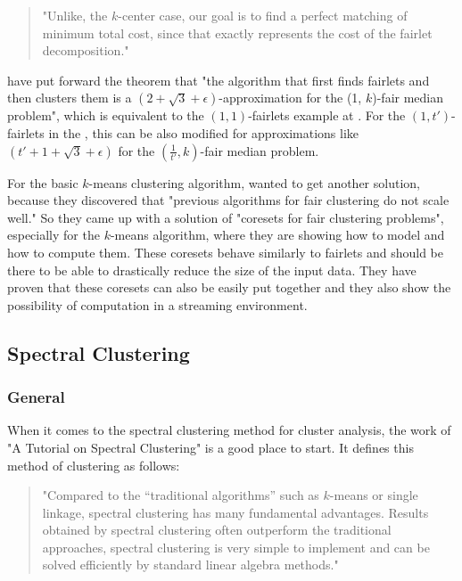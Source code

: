 \begin{quote}
"Unlike, the $k$-center case, our goal is to find a perfect matching of minimum total cost, since that exactly represents the cost of the fairlet decomposition."
\autocite[9]{Chierichetti2018}
\end{quote}

\textcite[]{Chierichetti2018} have put forward the theorem that "the algorithm that first finds fairlets and then clusters them is a $(2 + \sqrt{3} + \epsilon)$-approximation for the (1, $k$)-fair median problem", which is equivalent to the $(1, 1)$-fairlets example at . For the $(1,t')$-fairlets in the , this can be also modified for approximations like $(t' + 1 + \sqrt{3} + \epsilon)$ for the $(\frac{1}{t'}, k)$-fair median problem. \autocite[9]{Chierichetti2018}

For the basic $k$-means clustering algorithm, \textcite[]{Schmidt2018} wanted to get another solution, because they discovered that "previous algorithms for fair clustering do not scale well." So they came up with a solution of "coresets for fair clustering problems", especially for the $k$-means algorithm, where they are showing how to model and how to compute them. These coresets behave similarly to fairlets and should be there to be able to drastically reduce the size of the input data. They have proven that these coresets can also be easily put together and they also show the possibility of computation in a streaming environment. \autocite[1]{Schmidt2018} 


\subsection{Spectral Clustering}
\label{spectral-clustering}

\subsubsection{General}

When it comes to the spectral clustering method for cluster analysis, the work of \textcite[]{VonLuxburg2007}  "A Tutorial on Spectral Clustering" is a good place to start. It defines this method of clustering as follows:

\begin{quote}
"Compared to the “traditional algorithms” such as $k$-means or single linkage, spectral clustering has many fundamental advantages. Results obtained by spectral clustering often outperform the traditional approaches, spectral clustering is very simple to implement and can be solved efficiently by standard linear algebra methods."
\autocite[1]{VonLuxburg2007}
\end{quote}

